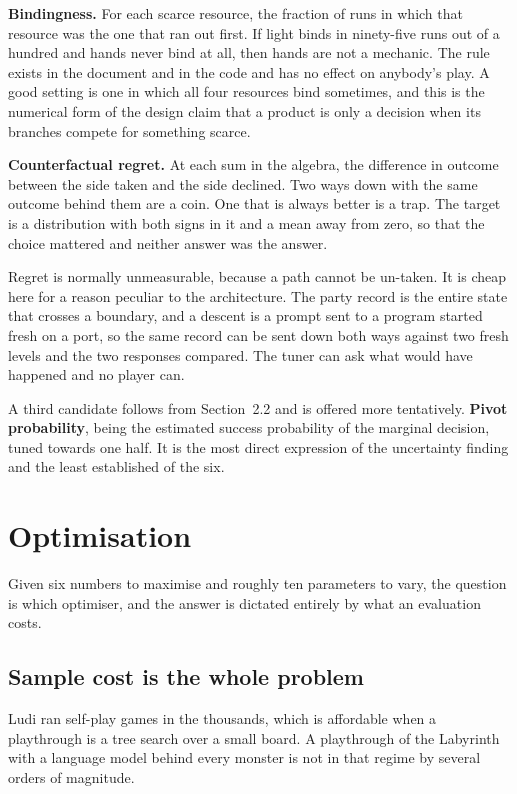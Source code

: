 \documentclass[11pt,a4paper]{article}
\begin{document}
\textbf{Bindingness.} For each scarce resource, the fraction of runs in which that resource was
the one that ran out first. If light binds in ninety-five runs out of a hundred and hands never
bind at all, then hands are not a mechanic. The rule exists in the document and in the code and
has no effect on anybody's play. A good setting is one in which all four resources bind
sometimes, and this is the numerical form of the design claim that a product is only a decision
when its branches compete for something scarce.

\textbf{Counterfactual regret.} At each sum in the algebra, the difference in outcome between the
side taken and the side declined. Two ways down with the same outcome behind them are a coin. One
that is always better is a trap. The target is a distribution with both signs in it and a mean
away from zero, so that the choice mattered and neither answer was the answer.

\begin{sectionbox}
Regret is normally unmeasurable, because a path cannot be un-taken. It is cheap here for a reason
peculiar to the architecture. The party record is the entire state that crosses a boundary, and a
descent is a prompt sent to a program started fresh on a port, so the same record can be sent
down both ways against two fresh levels and the two responses compared. The tuner can ask what
would have happened and no player can.
\end{sectionbox}

A third candidate follows from Section~2.2 and is offered more tentatively. \textbf{Pivot
probability}, being the estimated success probability of the marginal decision, tuned towards one
half. It is the most direct expression of the uncertainty finding and the least established of
the six.

\section{Optimisation}

Given six numbers to maximise and roughly ten parameters to vary, the question is which optimiser,
and the answer is dictated entirely by what an evaluation costs.

\subsection{Sample cost is the whole problem}
\label{sec:cost}

Ludi ran self-play games in the thousands, which is affordable when a playthrough is a tree
search over a small board. A playthrough of the Labyrinth with a language model behind every
monster is not in that regime by several orders of magnitude.
\end{document}
